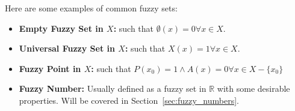 \begin{example}
    Here are some examples of common fuzzy sets:
    \begin{itemize}
        \item \textbf{Empty Fuzzy Set in $X$:} such that $\emptyset(x)=0 \forall x \in X$.
        \item \textbf{Universal Fuzzy Set in $X$:} such that $X(x)=1  \forall x \in X$.
        \item \textbf{Fuzzy Point in $X$:} such that $P(x_0)=1 \land A(x)=0 \forall x \in X-\{x_0\}$
        \item \textbf{Fuzzy Number:} Usually defined as a fuzzy set in $\mathbb{R}$ with some desirable properties. Will be covered in Section~\ref{sec:fuzzy_numbers}.
    \end{itemize}
\end{example}

